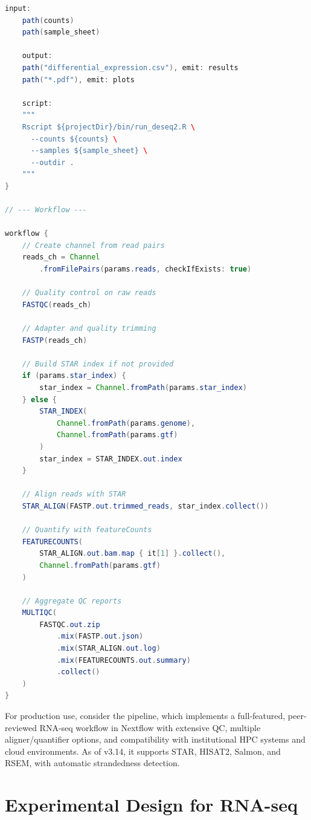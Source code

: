 \begin{lstlisting}[language=Java, caption={Complete Nextflow DSL2 workflow for
bulk RNA-seq analysis with STAR alignment and featureCounts quantification.},
label={lst:rnaseq:nextflow}]
    input:
    path(counts)
    path(sample_sheet)

    output:
    path("differential_expression.csv"), emit: results
    path("*.pdf"), emit: plots

    script:
    """
    Rscript ${projectDir}/bin/run_deseq2.R \
      --counts ${counts} \
      --samples ${sample_sheet} \
      --outdir .
    """
}

// --- Workflow ---

workflow {
    // Create channel from read pairs
    reads_ch = Channel
        .fromFilePairs(params.reads, checkIfExists: true)

    // Quality control on raw reads
    FASTQC(reads_ch)

    // Adapter and quality trimming
    FASTP(reads_ch)

    // Build STAR index if not provided
    if (params.star_index) {
        star_index = Channel.fromPath(params.star_index)
    } else {
        STAR_INDEX(
            Channel.fromPath(params.genome),
            Channel.fromPath(params.gtf)
        )
        star_index = STAR_INDEX.out.index
    }

    // Align reads with STAR
    STAR_ALIGN(FASTP.out.trimmed_reads, star_index.collect())

    // Quantify with featureCounts
    FEATURECOUNTS(
        STAR_ALIGN.out.bam.map { it[1] }.collect(),
        Channel.fromPath(params.gtf)
    )

    // Aggregate QC reports
    MULTIQC(
        FASTQC.out.zip
            .mix(FASTP.out.json)
            .mix(STAR_ALIGN.out.log)
            .mix(FEATURECOUNTS.out.summary)
            .collect()
    )
}
\end{lstlisting}

\begin{tipbox}
For production use, consider the  pipeline, which
implements a full-featured, peer-reviewed RNA-seq workflow in Nextflow with
extensive QC, multiple aligner/quantifier options, and compatibility with
institutional HPC systems and cloud environments. As of v3.14, it supports
STAR, HISAT2, Salmon, and RSEM, with automatic strandedness detection.
\end{tipbox}


\section{Experimental Design for RNA-seq}
\label{sec:rnaseq:design}

